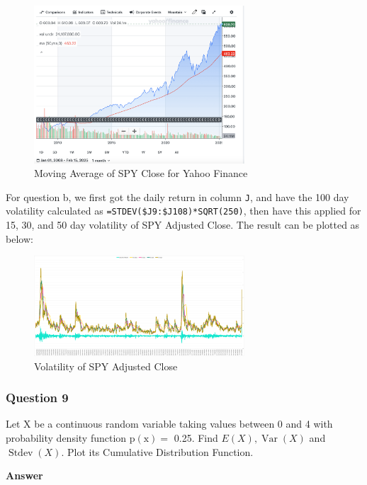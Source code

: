\documentclass[margin=1in]{article}
\begin{document}
	   \begin{figure}[h]
	   	\caption{Moving Average of SPY Close for Yahoo Finance}
	   	\centering
	   	\includegraphics[width=0.7\textwidth]{HW1_Q8_1_1}
	   \end{figure}
	   
	   For question b, we first got the daily return in column \texttt{J}, and have the 100 day volatility calculated as \texttt{=STDEV(\$J9:\$J108)*SQRT(250)}, then have this applied for 15, 30, and 50 day volatility of SPY Adjusted Close. The result can be plotted as below:
		   \begin{figure}[h]
		   	\caption{Volatility of SPY Adjusted Close}
		   	\centering
		   	\includegraphics[width=0.7\textwidth]{HW1_Q8_2}
		   \end{figure}
		   
		   
		   \pagebreak
		   
		   \subsubsection*{Question 9}
		   Let X be a continuous random variable taking values between 0 and 4 with probability density function $\mathrm{p}(\mathrm{x})=$ 0.25. Find $E(X), \operatorname{Var}(X)$ and $\operatorname{Stdev}(X)$. Plot its Cumulative Distribution Function.
		  
		   \textbf{Answer}
		   
\end{document}
